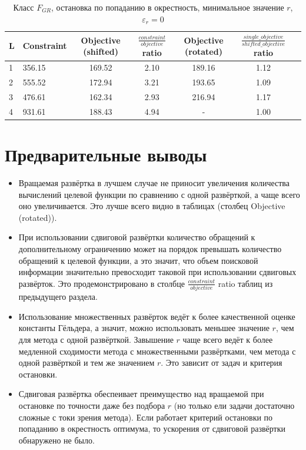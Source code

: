 \documentclass[a4paper]{article}
\begin{document}
\begin{table}[H]
\begin{center}
\caption{Класс $F_{GR}$, остановка по попаданию в окрестность, минимальное значение $r$, $\varepsilon_r=0$}
  \begin{tabular}{l|l*{5}{c}}
    \label{table:exp4}
  L & Constraint & Objective (shifted) & $\frac{constraint}{objective}$ ratio & Objective (rotated) & $\frac{single\_objective}{shifted\_objective}$ ratio \\
  \hline
  1 & 356.15 & 169.52 & 2.10 & 189.16 & 1.12 \\
  2 & 555.52 & 172.94 & 3.21 & 193.65 & 1.09 \\
  3 & 476.61 & 162.34 & 2.93 & 216.94 & 1.17 \\
  4 & 931.61 & 188.43 & 4.94 &  -     & 1.00 \\
  \end{tabular}
\end{center}
\end{table}

\section{Предварительные выводы}
\begin{itemize}
  \item Вращаемая развёртка в лучшем случае не приносит увеличения количества вычислений целевой функции по сравнению с одной развёрткой, а чаще всего оно увеличивается. Это лучше всего видно в таблицах (столбец Objective (rotated)).
  \item При использовании сдвиговой развёртки количество обращений к дополнительному ограничению может на порядок превышать количество обращений к целевой функции, а это значит, что объем поисковой информации значительно превосходит таковой при использовании сдвиговых развёрток. Это продемонстрировано в столбце $\frac{constraint}{objective}$ ratio таблиц из предыдущего раздела.
  \item Использование множественных развёрток ведёт к более качественной оценке константы Гёльдера, а значит, можно использовать меньшее значение $r$, чем для метода с одной развёрткой. Завышение $r$ чаще всего ведёт к более медленной сходимости метода с множественными развёртками, чем метода с одной развёрткой и тем же значением $r$. Это зависит от задач и критерия остановки.
  \item Сдвиговая развёртка обеспеивает преимущество над вращаемой при остановке по точности даже без подбора $r$ (но только ели задачи достаточно сложные с токи зрения метода). Если работает критерий остановки по попаданию в окрестность оптимума, то ускорения от сдвиговой развёртки обнаружено не было.
\end{itemize}
\end{document}
